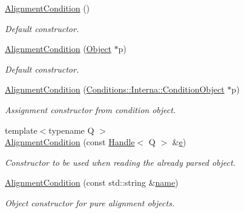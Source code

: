 \begin{DoxyCompactItemize}
\item 
\hyperlink{class_d_d4hep_1_1_alignments_1_1_alignment_condition_a47e83eec8de8934ae9787ecd328ce08e}{Alignment\+Condition} ()
\begin{DoxyCompactList}\small\item\em Default constructor. \end{DoxyCompactList}\item 
\hyperlink{class_d_d4hep_1_1_alignments_1_1_alignment_condition_a39dcb2c2af405eef6cdf0c35bd159823}{Alignment\+Condition} (\hyperlink{class_d_d4hep_1_1_alignments_1_1_alignment_condition_aad9d743ab04b8eb38063249c6a9e16c0}{Object} $\ast$p)
\begin{DoxyCompactList}\small\item\em Default constructor. \end{DoxyCompactList}\item 
\hyperlink{class_d_d4hep_1_1_alignments_1_1_alignment_condition_a5bd168115013833363882f86fe7b8259}{Alignment\+Condition} (\hyperlink{class_d_d4hep_1_1_conditions_1_1_interna_1_1_condition_object}{Conditions\+::\+Interna\+::\+Condition\+Object} $\ast$p)
\begin{DoxyCompactList}\small\item\em Assignment constructor from condition object. \end{DoxyCompactList}\item 
{\footnotesize template$<$typename Q $>$ }\\\hyperlink{class_d_d4hep_1_1_alignments_1_1_alignment_condition_a3a03bae4c8409c63a94d0c2e1c5c1ed6}{Alignment\+Condition} (const \hyperlink{class_d_d4hep_1_1_handle}{Handle}$<$ Q $>$ \&\hyperlink{_volumes_8cpp_a8a9a1f93e9b09afccaec215310e64142}{e})
\begin{DoxyCompactList}\small\item\em Constructor to be used when reading the already parsed object. \end{DoxyCompactList}\item 
\hyperlink{class_d_d4hep_1_1_alignments_1_1_alignment_condition_aac47c637a8b0c6f621e6c486244b21a2}{Alignment\+Condition} (const std\+::string \&\hyperlink{class_d_d4hep_1_1_handle_a27c7d467a609ab32c133e1f3c7d85ef5}{name})
\begin{DoxyCompactList}\small\item\em Object constructor for pure alignment objects. \end{DoxyCompactList}\item 

\end{DoxyCompactItemize}
